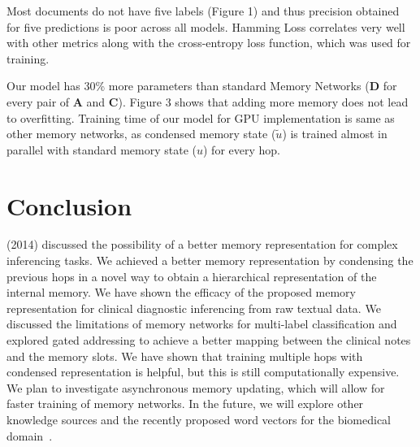     Most documents do not have five labels (Figure 1) and thus precision obtained for five predictions is poor across all models. Hamming Loss correlates very well with other metrics along with the cross-entropy loss function, which was used for training. 

    Our model has 30\% more parameters than standard Memory Networks ($\boldsymbol{D}$ for every pair of $\boldsymbol{A}$ and $\boldsymbol{C}$). Figure 3 shows that adding more memory does not lead to overfitting. Training time of our model for GPU implementation is same as other memory networks, as condensed memory state ($\widetilde{u}$) is trained almost in parallel with standard memory state ($u$) for every hop. 

\section{Conclusion}
\citeauthor{DBLP:journals/corr/WestonCB14} (2014) discussed the possibility of a better memory representation for complex inferencing tasks. We achieved a better memory representation by condensing the previous hops in a novel way to obtain a hierarchical representation of the internal memory. We have shown the efficacy of the proposed memory representation for clinical diagnostic inferencing from raw textual data. We discussed the limitations of memory networks for multi-label classification and explored gated addressing to achieve a better mapping between the clinical notes and the memory slots. We have shown that training multiple hops with condensed representation is helpful, but this is still computationally expensive. We plan to investigate asynchronous memory updating, which will allow for faster training of memory networks. In the future, we will explore other knowledge sources and the recently proposed word vectors for the biomedical domain~\cite{chiu2016train}. 
    
